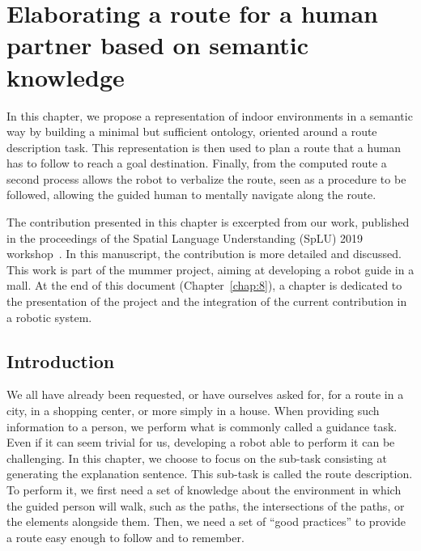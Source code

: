 \ifdefined{}
\else
\setcounter{chapter}{3} %
\dominitoc
\faketableofcontents
\fi

\chapter{Elaborating a route for a human partner based on semantic knowledge}
\label{chap:3}
\minitoc

In this chapter, we propose a representation of indoor environments in a semantic way by building a minimal but sufficient ontology, oriented around a route description task. This representation is then used to plan a route that a human has to follow to reach a goal destination. Finally, from the computed route a second process allows the robot to verbalize the route, seen as a procedure to be followed, allowing the guided human to mentally navigate along the route.

The contribution presented in this chapter is excerpted from our work, published in the proceedings of the Spatial Language Understanding (SpLU) 2019 workshop~\cite{sarthou_2019_semantic}. In this manuscript, the contribution is more detailed and discussed. This work is part of the \acrshort{mummer} project, aiming at developing a robot guide in a mall. At the end of this document (Chapter~\ref{chap:8}), a chapter is dedicated to the presentation of the project and the integration of the current contribution in a robotic system.

\section{Introduction}

We all have already been requested, or have ourselves asked for, for a route in a city, in a shopping center, or more simply in a house. When providing such information to a person, we perform what is commonly called a guidance task. Even if it can seem trivial for us, developing a robot able to perform it can be challenging. In this chapter, we choose to focus on the sub-task consisting at generating the explanation sentence. This sub-task is called the route description. To perform it, we first need a set of knowledge about the environment in which the guided person will walk, such as the paths, the intersections of the paths, or the elements alongside them. Then, we need a set of ``good practices'' to provide a route easy enough to follow and to remember.

